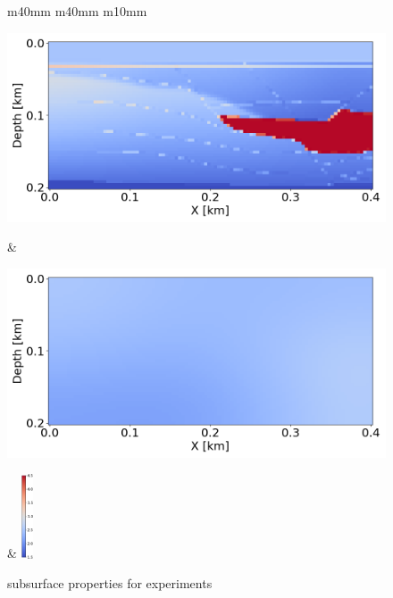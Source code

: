 \begin{figure}[t]
    \centering
    \begin{tabular}{m{40mm} m{40mm} m{10mm}}
        \begin{minipage}[b]{\linewidth}
            \centering
            \includegraphics[width=\linewidth]{public/true}
            \vspace{-9mm}
            \caption*{}
            \vspace{1mm}
        \end{minipage} &
        \hspace{-5mm}
        \begin{minipage}[b]{\linewidth}
            \centering
            \includegraphics[width=\linewidth]{public/initial}
            \vspace{-9mm}
            \caption*{}
            \vspace{1mm}
        \end{minipage} &
        \hspace{-8mm}
        \includegraphics[height=25mm]{public/color-bar}
    \end{tabular}
    \vspace{-3mm}
    \caption{subsurface properties for experiments}
    \label{fig:experiment-data}
\end{figure}
